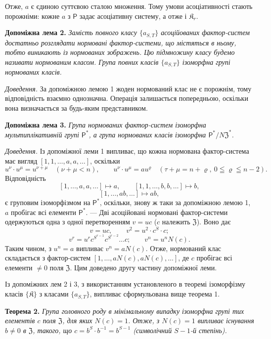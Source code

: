 \documentclass[11pt]{article}
\begin{document}
Отже, \(a\) є єдиною суттєвою сталою множення. Тому умови асоціативності стають порожніми: кожне \(a\) з \(\mathsf{P}\) задає асоціативну систему, а отже і \(\mathfrak K_r\).

\noindent\textbf{Допоміжна лема 2.} \emph{Замість повного класу \(\{a_{S,T}\}\) асоційованих фактор-систем достатньо розглядати нормовані фактор-системи, що містяться в ньому, тобто виникають із нормованих зображень. Цю підмножину класу будемо називати нормованим класом. Група повних класів \(\{a_{S,T}\}\) ізоморфна групі нормованих класів.}

\noindent\emph{Доведення.} За допоміжною лемою 1 жоден нормований клас не є порожнім, тому відповідність взаємно однозначна. Операція залишається попередньою, оскільки вона визначається за будь-яким представником.

\noindent\textbf{Допоміжна лема 3.} \emph{Група нормованих фактор-систем ізоморфна мультиплікативній групі \(\mathsf{P}^*\), а група нормованих класів ізоморфна \(\mathsf{P}^*/N\mathfrak Z^*\).}

\noindent\emph{Доведення.} Із допоміжної леми 1 випливає, що кожна нормована фактор-система має вигляд \([1,1,\ldots,a,a,\ldots]\), оскільки
\[
u^\nu\cdot u^\mu=u^{\nu+\mu}\quad(\nu+\mu<n),
\qquad
u^\nu\cdot u^\mu=au^\varrho\quad(\tau+\mu=n+\varrho,\ 0\leqq\varrho\leqq n-2).
\]
Відповідність
\[
[1,\ldots,a,a,\ldots]\mapsto a,
\qquad
[1,1,\ldots,b,b,\ldots]\mapsto b,
\]
\[
[1,\ldots,ab,\ldots]\mapsto ab,
\]
є груповим ізоморфізмом на \(\mathsf{P}^*\), оскільки, знову ж таки за допоміжною лемою 1, \(a\) пробігає всі елементи \(\mathsf{P}^*\). --- Дві асоційовані нормовані фактор-системи одержуються одна з одної перетворенням \(v=uc\) (\(c\) належить \(\mathfrak Z\)). Воно дає
\[
v=uc,\qquad v^2=u^2\cdot c^S\cdot c;
\]
\[
v^r=u^r c^{S^{r-1}}c^{S^{r-2}}\ldots c;
\qquad
v^n=u^nN(c).
\]
Таким чином, з \(u^n=a\) випливає \(v^n=aN(c)\). Отже, нормований клас складається з фактор-систем \([1,\ldots,aN(c),aN(c),\ldots]\), де \(c\) пробігає всі елементи \(\neq0\) поля \(\mathfrak Z\). Цим доведено другу частину допоміжної леми.

Із допоміжних лем 2 і 3, з використанням установленого в теоремі ізоморфізму класів \(\{\mathfrak K\}\) з класами \(\{a_{S,T}\}\), випливає сформульована вище теорема 1.

\noindent\textbf{Теорема 2.} \emph{Група головного роду в мінімальному випадку ізоморфна групі тих елементів \(c\) поля \(\mathfrak Z\), для яких \(N(c)=1\). Отже, з \(N(c)=1\) випливає існування \(b\neq0\) в \(\mathfrak Z\), такого, що \(c=b^S\cdot b^{-1}=b^{S-1}\) (символічний \(S-1\)-й степінь).}
\end{document}
